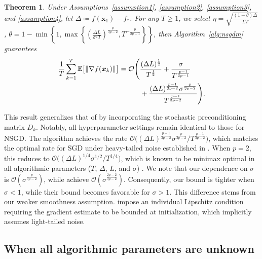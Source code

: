 \documentclass{article}
\newcommand{\bx}{\boldsymbol{x}}
\theoremstyle{plain}
\newtheorem{theorem}{Theorem}[section]
\theoremstyle{definition}
\theoremstyle{remark}
\begin{document}
\begin{theorem}\label{thm:full-main}
Under Assumptions~\ref{assumption1}, \ref{assumption2}, \ref{assumption3}, and \ref{assumption4}, let $\Delta \coloneqq f(\bx_1) - f_*$. For any $T \geq 1$, we select $\eta= 
    \sqrt{ \frac{(1 - \theta) \Delta}{L T}}$, $\theta = 1 - \min \left\{ 1, \max \left\{\left( \frac{\Delta L }{\sigma^2 T}\right)^{\frac{p}{3p-2}},T^{-\frac{p}{2p-1}}\right\} \right\}$, then 
Algorithm~\ref{alg:nsgdm} guarantees
\begin{align}\label{thm1:main-bound}
\frac{1}{T}  \sum_{k=1}^T \mathbb{E}  \bigl[ \|\nabla f(\bx_k)\| \bigr]
& = \mathcal{O} \Biggl( 
    \frac{ (\Delta L)^{\frac{1}{2}}}{T^{\frac{1}{2}}} + \frac{ \sigma }{T^{\frac{p-1}{2p-1}}} \notag \\
& \qquad \quad + \frac{ (\Delta L)^{\frac{p-1}{3p-2}} \sigma^{\frac{p}{3p-2}} }{T^{\frac{p-1}{3p-2}}}
\Biggr).
\end{align}
\end{theorem}

This result generalizes that of \cite{Liu2025Nonconvex} by incorporating the stochastic preconditioning matrix $D_k$. Notably, all hyperparameter settings remain identical to those for NSGD. The algorithm achieves the rate $\mathcal{O}\bigl((\Delta L)^{\frac{p-1}{3p-2}} \sigma^{\frac{p}{3p-2}}/T^{\frac{p-1}{3p-2}}\bigr)$, which matches the optimal rate for SGD under heavy-tailed noise established in \citet{Liu2025Nonconvex}. When $p=2$, this reduces to $\mathcal{O}\bigl((\Delta L)^{1/4} \sigma^{1/2}/T^{1/4}\bigr)$, which is known to be minimax optimal in all algorithmic parameters ($T$, $\Delta$, $L$, and $\sigma$) \citep{arjevani2023lower}. 
We note that our dependence on $\sigma$ is $\mathcal{O}(\sigma^{\frac{p}{3p-2}})$, while \citet{Sun2025Revisiting} achieve $\mathcal{O}(\sigma^{\frac{2p-2}{3p-2}})$. Consequently, our bound is tighter when $\sigma<1$, while their bound becomes favorable for $\sigma>1$. This difference stems from our weaker smoothness assumption. \citet{Sun2025Revisiting} impose an individual Lipschitz condition requiring the gradient estimate to be bounded at initialization, which implicitly assumes light-tailed noise. 

 







\subsection{When all algorithmic parameters are unknown}\label{subsec:algo_para_unknown}
\end{document}
